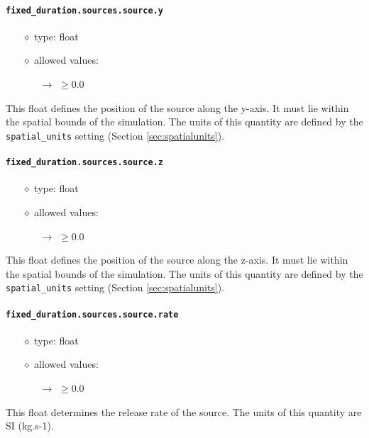 \documentclass[]{article}
\def\code#1{\texttt{#1}}
\begin{document}
\paragraph{\code{fixed\_duration.sources.source.y}}\label{sec:fixsourcey}
\begin{itemize}
    \item[$\diamond$] type: float 
    \item[$\diamond$] allowed values:
    \begin{itemize}
        \item[$\rightarrow$] $\geq0.0$
    \end{itemize}
\end{itemize}
This float defines the position of the source along the y-axis. It must lie
within the spatial bounds of the simulation. The units of this quantity are
defined by the \code{spatial\_units} setting (Section \ref{sec:spatialunits}).

\paragraph{\code{fixed\_duration.sources.source.z}}\label{sec:fixsourcez}
\begin{itemize}
    \item[$\diamond$] type: float 
    \item[$\diamond$] allowed values:
    \begin{itemize}
        \item[$\rightarrow$] $\geq0.0$
    \end{itemize}
\end{itemize}
This float defines the position of the source along the z-axis. It must lie
within the spatial bounds of the simulation. The units of this quantity are
defined by the \code{spatial\_units} setting (Section \ref{sec:spatialunits}).

\paragraph{\code{fixed\_duration.sources.source.rate}}\label{sec:fixsourcerate}
\begin{itemize}
    \item[$\diamond$] type: float 
    \item[$\diamond$] allowed values:
    \begin{itemize}
        \item[$\rightarrow$] $\geq0.0$
    \end{itemize}
\end{itemize}
This float determines the release rate of the source. The units of this quantity
are SI (kg.s-1).
\end{document}
